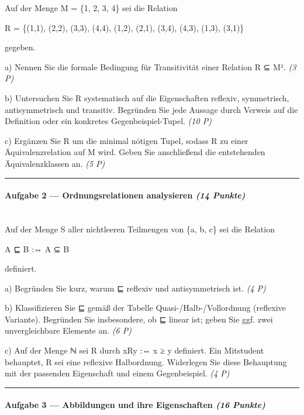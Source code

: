 \documentclass[11pt, a4paper]{article}
\begin{document}
Auf der Menge M = \{1, 2, 3, 4\} sei die Relation

R = \{(1,1), (2,2), (3,3), (4,4), (1,2), (2,1), (3,4), (4,3), (1,3), (3,1)\}

gegeben.


a) Nennen Sie die formale Bedingung für Transitivität einer Relation R ⊆ M². \textit{(3 P)}


b) Untersuchen Sie R systematisch auf die Eigenschaften reflexiv, symmetrisch, antisymmetrisch und transitiv. Begründen Sie jede Aussage durch Verweis auf die Definition oder ein konkretes Gegenbeispiel-Tupel. \textit{(10 P)}


c) Ergänzen Sie R um die minimal nötigen Tupel, sodass R zu einer Äquivalenzrelation auf M wird. Geben Sie anschließend die entstehenden Äquivalenzklassen an. \textit{(5 P)}



\noindent\textcolor{rulegray}{\rule{\linewidth}{0.4pt}}


\paragraph{Aufgabe 2 — Ordnungsrelationen analysieren \textit{(14 Punkte)}}\mbox{}\\[2pt]

Auf der Menge S aller nichtleeren Teilmengen von \{a, b, c\} sei die Relation

A ⊑ B :⇔ A ⊆ B

definiert.


a) Begründen Sie kurz, warum ⊑ reflexiv und antisymmetrisch ist. \textit{(4 P)}


b) Klassifizieren Sie ⊑ gemäß der Tabelle Quasi-/Halb-/Vollordnung (reflexive Variante). Begründen Sie insbesondere, ob ⊑ linear ist; geben Sie ggf. zwei unvergleichbare Elemente an. \textit{(6 P)}


c) Auf der Menge ℕ sei R durch xRy :⇔ x ≥ y definiert. Ein Mitstudent behauptet, R sei eine reflexive Halbordnung. Widerlegen Sie diese Behauptung mit der passenden Eigenschaft und einem Gegenbeispiel. \textit{(4 P)}



\noindent\textcolor{rulegray}{\rule{\linewidth}{0.4pt}}


\paragraph{Aufgabe 3 — Abbildungen und ihre Eigenschaften \textit{(16 Punkte)}}\mbox{}\\[2pt]
\end{document}
